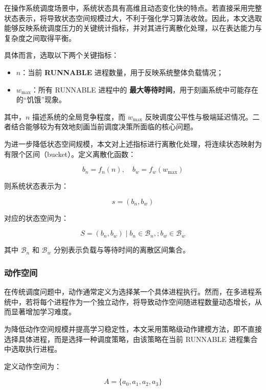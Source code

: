 在操作系统调度场景中，系统状态具有高维且动态变化快的特点。若直接采用完整状态表示，将导致状态空间规模过大，不利于强化学习算法收敛。因此，本文选取能够反映系统调度压力的关键统计指标，并对其进行离散化处理，以在表达能力与复杂度之间取得平衡。

具体而言，选取以下两个关键指标：

\begin{itemize}
\item $n$：当前 \textbf{RUNNABLE} 进程数量，用于反映系统整体负载情况；
\item $w_{\max}$：所有 RUNNABLE 进程中的 \textbf{最大等待时间}，用于刻画系统中可能存在的“饥饿”现象。
\end{itemize}

其中，$n$ 描述系统的全局竞争程度，而 $w_{\max}$ 反映调度公平性与极端延迟情况。二者结合能够较为有效地刻画当前调度决策所面临的核心问题。

为进一步降低状态空间规模，本文对上述指标进行离散化处理，将连续状态映射为有限个区间（bucket）。定义离散化函数：

\begin{equation}
b_n = f_n(n), \quad b_w = f_w(w_{\max})
\end{equation}

则系统状态表示为：

\begin{equation}
s = (b_n, b_w)
\end{equation}

对应的状态空间为：

\begin{equation}
S = { (b_n, b_w) \mid b_n \in \mathcal{B}_n,; b_w \in \mathcal{B}_w }
\end{equation}

其中 $\mathcal{B}_n$ 和 $\mathcal{B}_w$ 分别表示负载与等待时间的离散区间集合。

\subsubsection{动作空间}

在传统调度问题中，动作通常定义为选择某一个具体进程执行。然而，在多进程系统中，若将每个进程作为一个独立动作，将导致动作空间随进程数量动态增长，从而显著增加学习难度。

为降低动作空间规模并提高学习稳定性，本文采用策略级动作建模方法，即不直接选择具体进程，而是选择一种调度策略，由该策略在当前 RUNNABLE 进程集合中选取执行进程。

定义动作空间为：

\begin{equation}
A = \{a_0, a_1, a_2, a_3\}
\end{equation}

